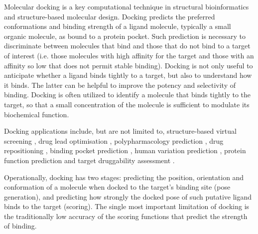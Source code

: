 Molecular docking is a key computational technique in structural bioinformatics and structure-based molecular design. Docking predicts the preferred conformations and binding strength of a ligand molecule, typically a small organic molecule, as bound to a protein pocket. Such prediction is necessary to discriminate between molecules that bind and those that do not bind to a target of interest (i.e. those molecules with high affinity for the target and those with an affinity so low that does not permit stable binding). Docking is not only useful to anticipate whether a ligand binds tightly to a target, but also to understand how it binds. The latter can be helpful to improve the potency and selectivity of binding. Docking is often utilized to identify a molecule that binds tightly to the target, so that a small concentration of the molecule is sufficient to modulate its biochemical function.

Docking applications include, but are not limited to, structure-based virtual screening \citep{455,1383,1448}, drug lead optimisation \citep{1385}, polypharmacology prediction \citep{1449,1450}, drug repositioning \citep{1384}, binding pocket prediction \citep{384,1217}, human variation prediction \citep{1451}, protein function prediction \citep{1386} and target druggability assessment \citep{1472}.

Operationally, docking has two stages: predicting the position, orientation and conformation of a molecule when docked to the target's binding site (pose generation), and predicting how strongly the docked pose of such putative ligand binds to the target (scoring).  The single most important limitation of docking is the traditionally low accuracy of the scoring functions that predict the strength of binding.

